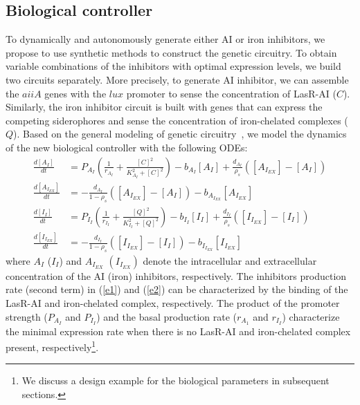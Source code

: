 \documentclass[runningheads]{llncs}
\begin{document}
\subsection{Biological controller}
To dynamically and autonomously generate either AI or iron inhibitors, we propose to use synthetic methods to construct the genetic circuitry. To obtain variable combinations of the inhibitors with optimal expression levels, we build two circuits separately. More precisely, to generate AI inhibitor, we can assemble the $aiiA$ genes with the $lux$ promoter to sense the concentration of LasR-AI ($C$). Similarly, the iron inhibitor circuit is built with genes that can express the competing siderophores and sense the concentration of iron-chelated complexes ($Q$). Based on the general modeling of genetic circuitry~\cite{Voigt2006}, we model the dynamics of the new biological controller with the following ODEs:
\begingroup\makeatletter\def\f@size{7.5}\check@mathfonts
\def\maketag@@@#1{\hbox{\m@th\small\normalfont#1}}%
\begin{align}
 \frac{d[A_I]}{dt} &= P_{{A_I}} (\frac{1}{r_{A_I}} + \frac{[C]^2}{K_{A_I}^2 + [C]^2 }) - b_{A_I} [A_{I}] + \frac{d_{A_I}}{\rho_{s}} ( [A_{I_{EX}}] - [A_{I}] ) \label{e1} \\ 
 \frac{d[A_{I_{EX}}]}{dt} &=  - \frac{d_{A_{I}}}{1-\rho_{s}} ( [A_{I_{EX}}] - [A_{I}] ) -  b_{A_{I_{EX}}} [A_{I_{EX}}] \\ 
 \frac{d[I_I]}{dt} &= P_{{I_I}} (\frac{1}{r_{I_I}} + \frac{[Q]^2}{K_{I_I}^2 + [Q]^2 }) - b_{I_I} [I_{I}] + \frac{d_{I_I}}{\rho_{s}} ( [I_{I_{EX}}] - [I_{I}] ) \label{e2} \\
 \frac{d[I_{I_{EX}}]}{dt} &=  - \frac{d_{I_I}}{1-\rho_s} ( [I_{I_{EX}}] - [I_{I}] ) -  b_{I_{I_{EX}}} [I_{I_{EX}}] \label{e2_end}
\end{align}\endgroup
where $A_I$ ($I_I$) and $A_{I_{EX}}$ $(I_{I_{EX}})$ denote the intracellular and extracellular concentration of the AI (iron) inhibitors, respectively. The inhibitors production rate (second term) in (\ref{e1}) and (\ref{e2}) can be characterized by the binding of the LasR-AI and iron-chelated complex, respectively.  The product of the promoter strength ($P_{A_I}$ and $P_{I_I}$) and the basal production rate ($r_{A_1}$ and $r_{I_{I}}$) characterize the minimal expression rate when there is no LasR-AI and iron-chelated complex present, respectively\footnote{We discuss a design example for the biological parameters in subsequent sections.}. 
\vspace{-10pt}
\end{document}
